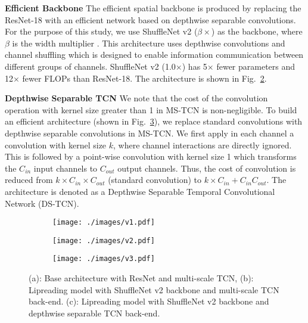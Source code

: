 \documentclass{article}
\begin{document}
\noindent\textbf{Efficient Backbone}\quad
The efficient spatial backbone is produced by replacing the ResNet-18 with an efficient network based on depthwise separable convolutions. For the purpose of this study, we use ShuffleNet v2 ($\beta\times$) as the backbone, where $\beta$ is the width multiplier \cite{ma2018shufflenet}. This architecture uses depthwise convolutions and channel shuffling which is designed to enable information communication between different groups of channels. ShuffleNet v2 (1.0$\times$) has 5$\times$ fewer parameters and 12$\times$ fewer FLOPs than ResNet-18. The architecture is shown in Fig.~\ref{fig:variations_b}.

\noindent\textbf{Depthwise Separable TCN}\quad
We note that the cost of the convolution operation with kernel size greater than 1 in MS-TCN is non-negligible. To build an efficient architecture (shown in Fig.~\ref{fig:variations_c}), we replace standard convolutions with depthwise separable convolutions in MS-TCN. We first apply in each channel a convolution with kernel size $k$, where channel interactions are directly ignored. This is followed by a point-wise convolution with kernel size 1 which transforms the $C_{in}$ input channels  to $C_{out}$ output channels.  Thus, the cost of convolution is reduced from $k \times C_{in} \times C_{out}$ (standard convolution) to $ k\times C_{in} + C_{in}C_{out}$. The architecture is denoted as a Depthwise Separable Temporal Convolutional Network (DS-TCN). 

\begin{figure}[t]
    \centering
    \begin{subfigure}{.22\columnwidth}
    \texttt{[image: ./images/v1.pdf]}
    \caption{}
    \label{fig:variations_a}  
    \end{subfigure}\hfill \begin{subfigure}{.22\columnwidth}
    \texttt{[image: ./images/v2.pdf]}
    \caption{}
    \label{fig:variations_b}  
    \end{subfigure}\hfill \begin{subfigure}{.22\columnwidth}
    \texttt{[image: ./images/v3.pdf]}
    \caption{}
    \label{fig:variations_c}  
    \end{subfigure}
    
\caption[architecture]{(a): Base architecture with ResNet and multi-scale TCN, (b): Lipreading model with ShuffleNet v2 backbone and multi-scale TCN back-end. (c): Lipreading model with ShuffleNet v2 backbone and depthwise separable TCN back-end.
    }
\label{fig:architecture}
\vspace{-2mm}
\end{figure}
\end{document}
